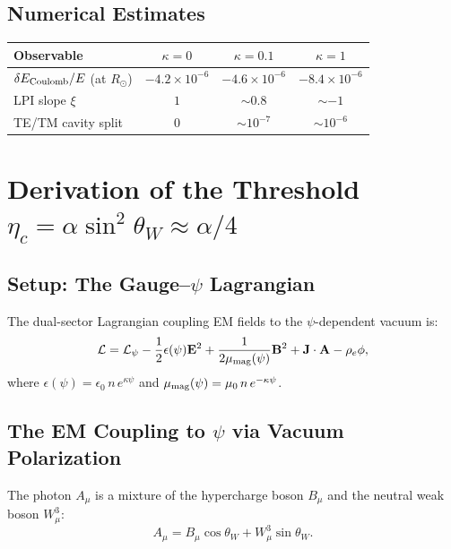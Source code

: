 \documentclass[11pt]{article}
\newcommand{\vE}{\mathbf{E}}
\newcommand{\vB}{\mathbf{B}}
\newcommand{\vJ}{\mathbf{J}}
\begin{document}
\subsection{Numerical Estimates}

\begin{center}
\begin{tabular}{lccc}
\toprule
\textbf{Observable} & $\kappa = 0$ & $\kappa = 0.1$ & $\kappa = 1$ \\
\midrule
$\delta E_{\rm Coulomb}/E$ (at $R_\odot$) & $-4.2\times 10^{-6}$ & $-4.6\times 10^{-6}$ & $-8.4\times 10^{-6}$ \\
LPI slope $\xi$ & $1$ & $\sim 0.8$ & $\sim -1$ \\
TE/TM cavity split & $0$ & $\sim 10^{-7}$ & $\sim 10^{-6}$ \\
\bottomrule
\end{tabular}
\end{center}

\section{Derivation of the Threshold $\eta_c = \alpha\sin^2\theta_W \approx \alpha/4$}
\label{sec:eta-derivation}

\subsection{Setup: The Gauge--$\psi$ Lagrangian}

The dual-sector Lagrangian coupling EM fields to the $\psi$-dependent vacuum is:
\begin{equation}
\mathcal{L} = \mathcal{L}_\psi
- \frac{1}{2}\epsilon(\psi)\vE^2 + \frac{1}{2\mu_{\rm mag}(\psi)}\vB^2
+ \vJ\cdot\mathbf{A} - \rho_e\phi,
\label{eq:EM-psi-lagrangian}
\end{equation}
where $\epsilon(\psi) = \epsilon_0\, n\, e^{\kappa\psi}$ and
$\mu_{\rm mag}(\psi) = \mu_0\, n\, e^{-\kappa\psi}$.

\subsection{The EM Coupling to $\psi$ via Vacuum Polarization}

The photon $A_\mu$ is a mixture of the hypercharge boson $B_\mu$ and the
neutral weak boson $W^3_\mu$:
\begin{equation}
A_\mu = B_\mu\cos\theta_W + W^3_\mu\sin\theta_W.
\end{equation}
\end{document}
